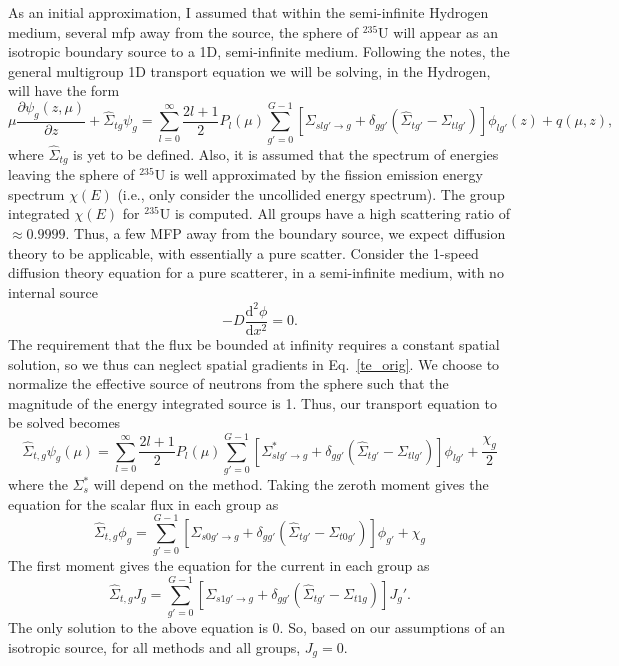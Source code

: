 \documentclass[12pt]{article}
\newcommand{\pderiv}[2]{\frac{\partial #1}{\partial #2}}
\renewcommand{\d}{\mathrm{d}}
\newcommand{\ra}{\rightarrow}
\newenvironment{solnum}[2][Solution]{\begin{trivlist}
\item[\hskip \labelsep {\bfseries #1}\hskip \labelsep {\bfseries #2:}]\hspace{0.3in}\newline\newline}{\end{trivlist}}
\newcommand{\iso}[2]{\ensuremath{^{#2}\text{#1}}}
\begin{document}
\begin{solnum}{1-2}
\begin{solnum}{2}
As an initial approximation, I assumed that within the semi-infinite Hydrogen medium, several
mfp away from the source, the sphere of \iso{U}{235} will appear as an isotropic
boundary source to a 1D, semi-infinite medium.  Following the notes, the general multigroup
1D transport equation we will be solving, in the Hydrogen, will have the form
\begin{equation}\label{te_orig}
    \mu\pderiv{\psi_g(z,\mu)}{z} +\hat\Sigma_{tg}\psi_g = \sum_{l=0}^\infty
    \frac{2l+1}{2} P_l(\mu) \sum_{g'=0}^{G-1}\left[\Sigma_{slg'\ra g} +
    \delta_{gg'}\left(\hat\Sigma_{tg'}-\Sigma_{tlg'}\right)\right]\phi_{lg'}(z) +
    q(\mu,z),
\end{equation}
where $\hat\Sigma_{tg}$ is yet to be defined.
Also, it is assumed that the spectrum of energies leaving the sphere of \iso{U}{235} is well
approximated by the fission emission energy spectrum $\chi(E)$ (i.e., only consider the
uncollided energy spectrum).  The group integrated $\chi(E)$ for \iso{U}{235} is
computed.  All groups have a high scattering ratio of $\approx0.9999$.  Thus, a
few MFP away from the boundary source, we expect diffusion theory to be applicable,
with essentially a pure scatter. Consider the 1-speed diffusion theory equation for a pure
scatterer, in a semi-infinite medium, with no internal source
\begin{equation}
    -D \frac{\d^2\phi}{\d x^2} = 0.
\end{equation}
The requirement that the flux be bounded at infinity requires a constant spatial
solution, so we thus can neglect spatial gradients in Eq.~\eqref{te_orig}.
We choose to normalize the effective source of neutrons from the sphere such that the
magnitude of the energy integrated source is 1.  Thus, our transport equation to be solved becomes
\begin{equation}
    \hat\Sigma_{t,g}\psi_g(\mu) = \sum_{l=0}^\infty
    \frac{2l+1}{2} P_l(\mu) \sum_{g'=0}^{G-1}\left[\Sigma^*_{slg'\ra g} +
    \delta_{gg'}\left(\hat\Sigma_{tg'}-\Sigma_{tlg'}\right)\right]\phi_{lg'} +
    \frac{\chi_g}{2}
\end{equation}
where the $\Sigma_s^*$ will depend on the method.
Taking the zeroth moment gives the equation for the scalar flux in each group as
\begin{equation}
    \hat\Sigma_{t,g}\phi_g = \sum_{g'=0}^{G-1}\left[\Sigma_{s0g'\ra g} +
    \delta_{gg'}\left(\hat\Sigma_{tg'}-\Sigma_{t0g'}\right)\right]\phi_{g'} +
    \chi_g
\end{equation}
The first moment gives the equation for the current in each group as
\begin{equation}
    \hat\Sigma_{t,g}J_g = \sum_{g'=0}^{G-1}\left[\Sigma_{s1g'\ra g} +
    \delta_{gg'}\left(\hat\Sigma_{tg'}-\Sigma_{t1g}\right)\right]J_g'.
\end{equation}
The only solution to the above equation is 0.  So, based on our assumptions of an
isotropic source, for all methods and all groups, $\boxed{J_g=0}$.


\end{solnum}
\end{solnum}
\end{document}
